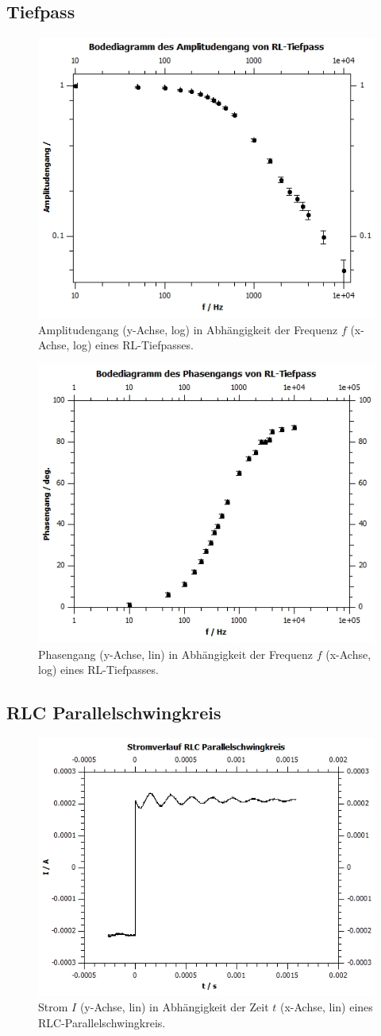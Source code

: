 \documentclass[12pt,a4paper,twoside]{article}
\begin{document}
\subsection{Tiefpass}
\begin{figure}[H]
    \centering
    \includegraphics[width=0.6\linewidth]{nudes/Plot a2 amp.jpg}
    \caption{Amplitudengang (y-Achse, log) in Abhängigkeit der Frequenz $f$ (x-Achse, log) eines RL-Tiefpasses. }
    \label{fig:zus a2 amp} 
\end{figure}

\begin{figure}[H]
    \centering
    \includegraphics[width=0.6\linewidth]{nudes/Plot a2 ph.jpg}
    \caption{Phasengang (y-Achse, lin) in Abhängigkeit der Frequenz $f$ (x-Achse, log) eines RL-Tiefpasses. }
    \label{fig:zus a2 ph} 
\end{figure}

\subsection{RLC Parallelschwingkreis}
\begin{figure}[H]
    \centering
    \includegraphics[width=0.6\linewidth]{nudes/Plot a3.jpg}
    \caption{Strom $I$ (y-Achse, lin) in Abhängigkeit der Zeit $t$ (x-Achse, lin) eines RLC-Parallelschwingkreis. }
    \label{fig:zus a3} 
\end{figure}
\end{document}
